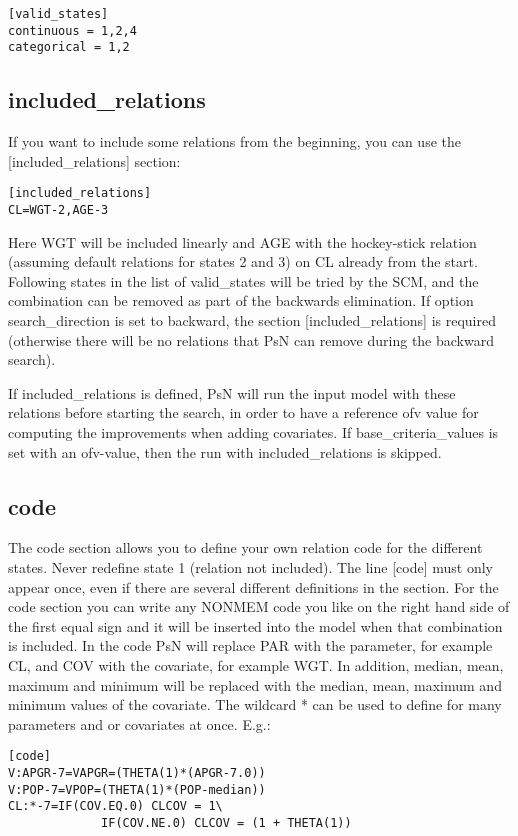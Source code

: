 \documentclass[a4paper,12pt]{article}
\begin{document}
\begin{verbatim}
[valid_states]
continuous = 1,2,4
categorical = 1,2
\end{verbatim}

\subsection{included\_relations}
If you want to include some relations from the beginning, you can use the [included\_relations] section:

\begin{verbatim}
[included_relations]
CL=WGT-2,AGE-3
\end{verbatim}

Here WGT will be included linearly and AGE with the hockey-stick relation (assuming default relations for states 2 and 3) on CL already from the start. Following states in the list of valid\_states will be tried by the SCM, and the combination can be removed as part of the backwards elimination. If option search\_direction is set to backward, the section [included\_relations] is required (otherwise there will be no relations that PsN can remove during the backward search).

If included\_relations is defined, PsN will run the input model with these relations before starting the search, in order to have a reference ofv value for computing the improvements when adding covariates. If base\_criteria\_values is set with an ofv-value, then the run with included\_relations is skipped. 

\subsection{code}
The code section allows you to define your own relation code for the different states. Never redefine state 1 (relation not included). The line [code] must only appear once, even if there are several different definitions in the section. For the code section you can write any NONMEM code you like on the right hand side of the first equal sign and it will be inserted into the model when that combination is included. In the code PsN will replace PAR with the parameter, for example CL, and COV with the covariate, for example WGT. In addition, median, mean, maximum and minimum will be replaced with the median, mean, maximum and minimum values of the covariate. The wildcard * can be used to define for many parameters and or covariates at once. E.g.:

\begin{verbatim}
[code]
V:APGR-7=VAPGR=(THETA(1)*(APGR-7.0))
V:POP-7=VPOP=(THETA(1)*(POP-median))
CL:*-7=IF(COV.EQ.0) CLCOV = 1\ 
             IF(COV.NE.0) CLCOV = (1 + THETA(1))
\end{verbatim}
\end{document}
